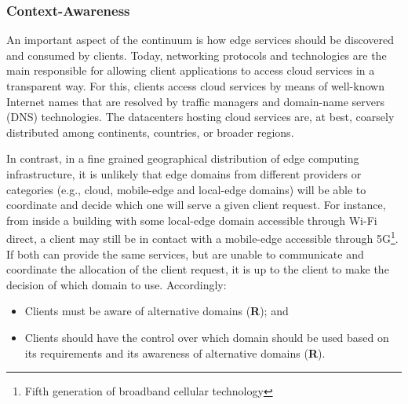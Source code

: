 \subsubsection*{Context-Awareness}



An important aspect of the continuum is how edge services should be discovered and consumed by clients. Today, networking protocols and technologies are the main responsible for allowing client applications to access cloud services in a transparent way. For this, clients access cloud services by means of well-known Internet names that are resolved by traffic managers and domain-name servers (DNS) technologies. The datacenters hosting cloud services are, at best, coarsely distributed among continents, countries, or broader regions. 

In contrast, in a fine grained geographical distribution of edge computing infrastructure, it is unlikely that edge domains from different providers or categories (e.g., cloud, mobile-edge and local-edge domains) will be able to coordinate and decide which one will serve a given client request. For instance, from inside a building with some local-edge domain accessible through Wi-Fi direct, a client may still be in contact with a mobile-edge accessible through 5G\footnote{Fifth generation of broadband cellular technology}. If both can provide the same services, but are unable to communicate and coordinate the allocation of the client request, it is up to the client to make the decision of which domain to use. Accordingly:

\begin{itemize}
	
	\item Clients must be aware of alternative domains (\textbf{R}); and
	
	\item Clients should have the control over which domain should be used based on its requirements and its awareness of alternative domains (\textbf{R}).
	
\end{itemize}

